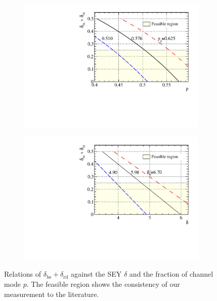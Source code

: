 \begin{figure}[!htbp]
	\centering
	\begin{subfigure}{0.48\textwidth}
		\centering
		\includegraphics[width=\linewidth]{PMTRelated/GTmodel/parameter_pp0.pdf}
		\caption{}
		\label{fig:pp0}
	\end{subfigure}
	\hfill
	\begin{subfigure}{0.48\textwidth}
		\centering
		\includegraphics[width=\linewidth]{PMTRelated/GTmodel/parameters_ts.pdf}
		\caption{}
		\label{fig:tsts}
	\end{subfigure}
	\caption{Relations of \(\delta_\text{bs} + \delta_\text{rd}\) against the SEY \(\delta\) and the fraction of channel mode \(p\).
		The feasible region shows the consistency of our measurement to the literature.}
	\label{fig:pdelta}
\end{figure}

